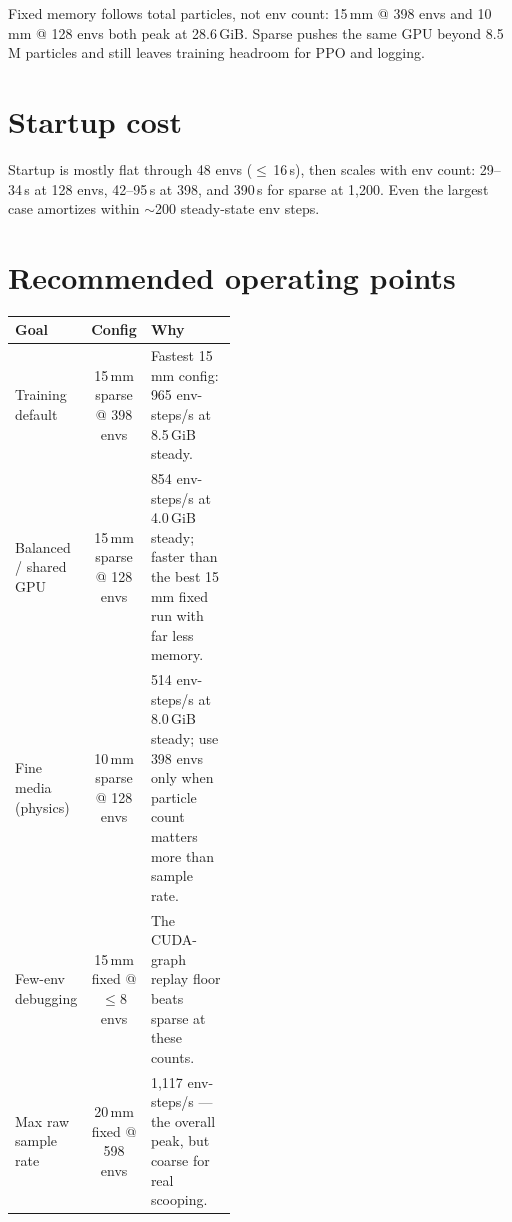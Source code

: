 \documentclass[a4paper,11pt]{article}
\newenvironment{reporttable}{%
  \vspace{0.35em}%
  \begin{center}%
  \small
  \renewcommand{\arraystretch}{1.3}%
  \setlength{\tabcolsep}{11pt}%
}{%
  \end{center}%
  \vspace{0.55em}%
}
\begin{document}
Fixed memory follows total particles, not env count: 15\,mm @ 398 envs and 10\,mm @ 128 envs both
peak at 28.6\,GiB. Sparse pushes the same GPU beyond 8.5\,M particles and still leaves training
headroom for PPO and logging.

\section{Startup cost}

Startup is mostly flat through 48 envs ($\leq$\,16\,s), then scales with env count: 29--34\,s at
128 envs, 42--95\,s at 398, and 390\,s for sparse at 1{,}200. Even the largest case amortizes
within $\sim$200 steady-state env steps.

\section{Recommended operating points}

\begin{reporttable}
\begin{tabular}{@{}l c p{0.44\linewidth}@{}}
\toprule
\textbf{Goal} & \textbf{Config} & \textbf{Why} \\
\midrule
Training default        & 15\,mm sparse @ 398 envs & Fastest 15\,mm config: 965 env-steps/s at
                                              8.5\,GiB steady. \\
Balanced / shared GPU   & 15\,mm sparse @ 128 envs & 854 env-steps/s at 4.0\,GiB steady;
                                              faster than the best 15\,mm fixed run with far less
                                              memory. \\
Fine media (physics)    & 10\,mm sparse @ 128 envs & 514 env-steps/s at 8.0\,GiB steady; use
                                              398 envs only when particle count matters more than
                                              sample rate. \\
Few-env debugging       & 15\,mm fixed @ $\leq$8 envs & The CUDA-graph replay floor
                                              beats sparse at these counts. \\
Max raw sample rate     & 20\,mm fixed @ 598 envs & 1{,}117 env-steps/s --- the overall peak, but
                                              coarse for real scooping. \\
\bottomrule
\end{tabular}
\end{reporttable}
\end{document}
